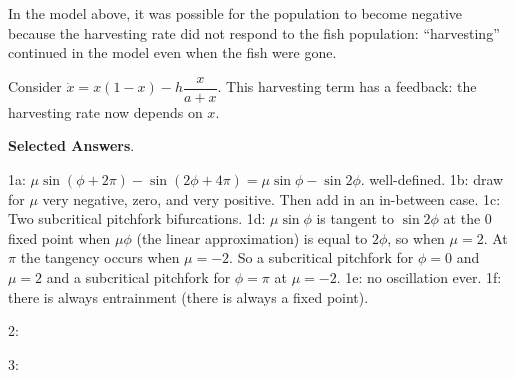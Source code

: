 \documentclass[12pt,letterpaper,noanswers]{exam}
\begin{document}
\begin{questions}
\item In the model above, it was possible for the population to become negative because the harvesting rate did not respond to the fish population: ``harvesting'' continued in the model even when the fish were gone.

Consider $\dot x = x(1-x) - h\dfrac{x}{a+x}$.  This harvesting term has a feedback: the harvesting rate now depends on $x$.


\end{questions}

\vfill

\eject
\noindent\textbf{Selected Answers}.

1a: $\mu\sin(\phi+2\pi) -\sin(2\phi+ 4\pi) = \mu\sin\phi-\sin 2\phi$.  well-defined.  1b: draw for $\mu$ very negative, zero, and very positive.  Then add in an in-between case.  1c: Two subcritical pitchfork bifurcations.  1d: $\mu\sin\phi$ is tangent to $\sin 2\phi$ at the $0$ fixed point when $\mu\phi$ (the linear approximation) is equal to $2\phi$, so when $\mu = 2$.  At $\pi$ the tangency occurs when $\mu = -2$.  So a subcritical pitchfork for $\phi = 0$ and $\mu = 2$ and a subcritical pitchfork for $\phi = \pi$ at $\mu = -2$.  1e: no oscillation ever.  1f: there is always entrainment (there is always a fixed point).

2:

3:
\end{document}
